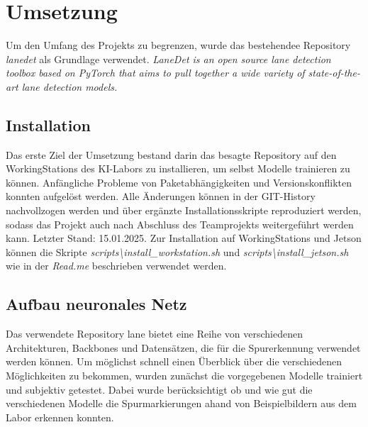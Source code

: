\documentclass{article}
\begin{document}
    \section{Umsetzung}
        Um den Umfang des Projekts zu begrenzen, wurde das bestehendee Repository \textit{lanedet} als Grundlage verwendet.
        \textit{LaneDet is an open source lane detection toolbox based on PyTorch that aims to pull together a wide variety of state-of-the-art lane detection models.}

        \subsection{Installation}
            Das erste Ziel der Umsetzung bestand darin das besagte Repository auf den WorkingStations des KI-Labors zu installieren, um selbst Modelle trainieren zu können.
            Anfängliche Probleme von Paketabhängigkeiten und Versionskonflikten konnten aufgelöst werden. 
            Alle Änderungen können in der GIT-History nachvollzogen werden und über ergänzte Installationsskripte reproduziert werden, sodass das Projekt auch nach Abschluss des Teamprojekts weitergeführt werden kann. Letzter Stand: 15.01.2025. %
            Zur Installation auf WorkingStations und Jetson können die Skripte \textit{scripts\textbackslash install\_workstation.sh} und \textit{scripts\textbackslash install\_jetson.sh} wie in der \textit{Read.me} beschrieben verwendet werden.

        \subsection{Aufbau neuronales Netz}
            Das verwendete Repository lane bietet eine Reihe von verschiedenen Architekturen, Backbones und Datensätzen, die für die Spurerkennung verwendet werden können.
            Um möglichst schnell einen Überblick über die verschiedenen Möglichkeiten zu bekommen, wurden zunächst die vorgegebenen Modelle trainiert und subjektiv getestet.
            Dabei wurde berücksichtigt ob und wie gut die verschiedenen Modelle die Spurmarkierungen ahand von Beispielbildern aus dem Labor erkennen konnten.
\end{document}
